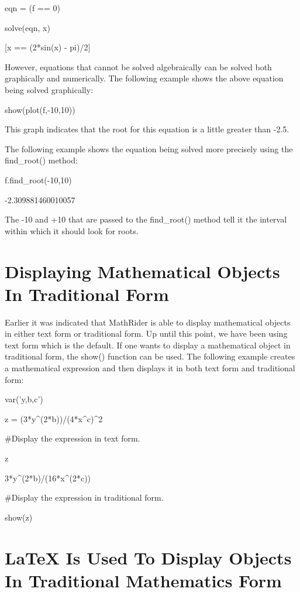 \documentclass[12pt,oneside]{book}
\begin{document}
eqn = (f == 0)

solve(eqn, x)

{\textbar}

[x == (2*sin(x) {}- pi)/2]


However, equations that cannot be solved algebraically can be solved both graphically and numerically. The following example shows the above equation being solved graphically: 

show(plot(f,{}-10,10))

{\textbar}


This graph indicates that the root for this equation is a little greater than {}-2.5. 

The following example shows the equation being solved more precisely using the find\_root() method: 

f.find\_root({}-10,10)

{\textbar}

{}-2.309881460010057


The {}-10 and +10 that are passed to the find\_root() method tell it the interval within which it should look for roots.

\section[Displaying Mathematical Objects In Traditional Form]{Displaying Mathematical Objects In Traditional Form}

Earlier it was indicated that MathRider is able to display mathematical objects in either text form or traditional form. Up until this point, we have been using text form which is the default. If one wants to display a mathematical object in traditional form, the show() function can be used. The following example creates a mathematical expression and then displays it in both text form and traditional form: 

var('y,b,c')

z = (3*y\^{}(2*b))/(4*x\^{}c)\^{}2


\#Display the expression in text form.

z

{\textbar}

3*y\^{}(2*b)/(16*x\^{}(2*c))

\#Display the expression in traditional form.

show(z)

{\textbar}


 


\section[LaTeX Is Used To Display Objects In Traditional Mathematics Form]{LaTeX Is Used To Display Objects In Traditional Mathematics Form}
\end{document}
